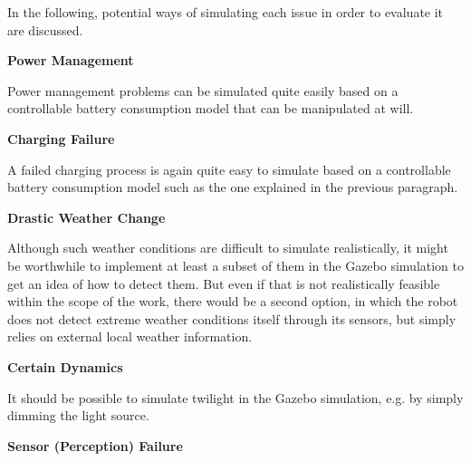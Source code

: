 \documentclass[english, master, utf8]{base/thesis_KBS}
\begin{document}
In the following, potential ways of simulating each issue in order to evaluate it are discussed.\newline

\noindent
\textbf{Power Management}\newline

\noindent
Power management problems can be simulated quite easily based on a controllable battery consumption model that can be manipulated at will.\newline

\noindent
\textbf{Charging Failure}\newline

\noindent
A failed charging process is again quite easy to simulate based on a controllable battery consumption model such as the one explained in the previous paragraph.\newline

\noindent
\textbf{Drastic Weather Change}\newline

\noindent
Although such weather conditions are difficult to simulate realistically, it might be worthwhile to implement at least a subset of them in the Gazebo
simulation to get an idea of how to detect them. But even if that is not realistically feasible within the scope of the work, there would be a second
option, in which the robot does not detect extreme weather conditions itself through its sensors, but simply relies on external local weather information.\newline

\noindent
\textbf{Certain Dynamics}\newline

\noindent
It should be possible to simulate twilight in the Gazebo simulation, e.g. by simply dimming the light source.\newline

\noindent
\textbf{Sensor (Perception) Failure}\newline
\end{document}
